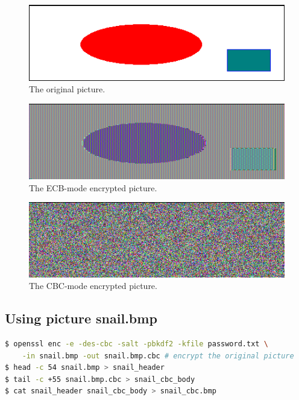 \begin{figure}
    \centering
    \includegraphics[height=\textheight,width=\textwidth,keepaspectratio]
    {figures/pic_original.png}
    \caption{The original picture.}\label{fig:original_pic}
\end{figure}

\begin{figure}
    \centering
    \includegraphics[height=\textheight,width=\textwidth,keepaspectratio]
    {figures/pic_ecb.png}
    \caption{The ECB-mode encrypted picture.}\label{fig:ecb_pic}
\end{figure}

\begin{figure}
    \centering
    \includegraphics[height=\textheight,width=\textwidth,keepaspectratio]
    {figures/pic_cbc.png}
    \caption{The CBC-mode encrypted picture.}\label{fig:cbc_pic}
\end{figure}

\subsection{Using picture {\selectfont snail.bmp}}
%
\begin{lstlisting}[language=Bash, caption=Commands generating
    {\fontfamily{qcr}\selectfont snail\_cbc.bmp}, label={
        lst:snail_cbc
    }]
$ openssl enc -e -des-cbc -salt -pbkdf2 -kfile password.txt \
    -in snail.bmp -out snail.bmp.cbc # encrypt the original picture
$ head -c 54 snail.bmp > snail_header
$ tail -c +55 snail.bmp.cbc > snail_cbc_body
$ cat snail_header snail_cbc_body > snail_cbc.bmp
\end{lstlisting}

